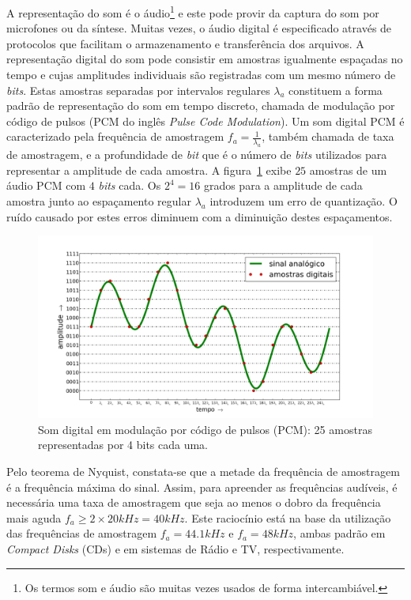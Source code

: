 A representação do som é o áudio\footnote{Os termos
som e áudio são muitas vezes usados de forma intercambiável.\cite{Everest}} e este pode provir da captura do som por microfones ou da síntese. Muitas vezes, o áudio digital é especificado através de protocolos que facilitam o armazenamento e transferência dos arquivos. A representação digital do som pode consistir em amostras igualmente espaçadas no tempo e cujas amplitudes individuais são registradas com um mesmo número de \emph{bits}. Estas amostras separadas por intervalos regulares $\lambda_a$ constituem a forma padrão de representação do som em tempo discreto, chamada de modulação por código de pulsos (PCM do inglês \emph{Pulse Code Modulation}).
Um som digital PCM é caracterizado pela frequência de amostragem $f_a=\frac{1}{\lambda_a}$, também chamada de taxa de amostragem, e a profundidade de \emph{bit} que é o número de \emph{bits} utilizados para representar a amplitude de cada amostra. A figura~\ref{fig:PCM} exibe $25$ amostras de um áudio PCM com $4$ \emph{bits} cada. Os $2^4=16$ grados para a amplitude de cada amostra junto ao espaçamento regular $\lambda_a$ introduzem um erro de quantização. O ruído causado por estes erros diminuem com a diminuição destes espaçamentos.\cite{audioMedia} 


\begin{figure}[h!]
    \centering
        \includegraphics[width=\textwidth]{figuras/pcm}
        \caption{Som digital em modulação por código de pulsos (PCM): 25 amostras representadas por 4 bits cada uma.}
        \label{fig:PCM}
\end{figure}

Pelo teorema de Nyquist, constata-se que a metade da frequência de amostragem é a frequência máxima do sinal. Assim, para apreender as frequências audíveis, é necessária uma taxa de amostragem que seja ao menos o dobro da frequência mais aguda $f_a \geq 2\times 20kHz=40kHz$. Este raciocínio está na base da utilização das frequências de amostragem $f_a=44.1kHz$ e $f_a=48kHz$, ambas padrão em \emph{Compact Disks} (CDs) e em sistemas de Rádio e TV, respectivamente.\cite{audioMedia}


